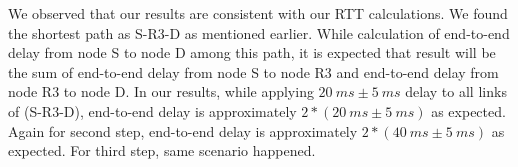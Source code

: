 \documentclass[12pt]{article}
\begin{document}
We observed that our results are consistent with our RTT calculations. We found the shortest path as S-R3-D as mentioned earlier. While calculation of end-to-end delay from node S to node D among this path, it is expected that result will be the sum of end-to-end delay from node S to node R3 and end-to-end delay from node R3 to node D. In our results, while applying $20 \ ms \pm 5 \ ms$ delay to all links of (S-R3-D), end-to-end delay is approximately $2* (20 \ ms \pm 5 \ ms)$ as expected. Again for second step, end-to-end delay is approximately $2* (40 \ ms \pm 5 \ ms)$ as expected. For third step, same scenario happened.

  
\end{document}
